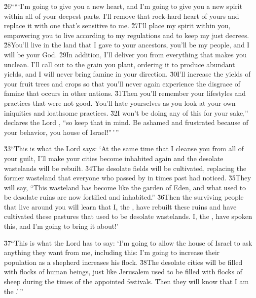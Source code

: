 \v{26}`````I'm going to give you a new heart, and I'm going to give you a new spirit within all of your deepest parts. I'll remove that rock-hard heart of yours and replace it with one that's sensitive to me. \v{27}I'll place my spirit within you, empowering you to live according to my regulations and to keep my just decrees. \v{28}You'll live in the land that I gave to your ancestors, you'll be my people, and I will be your God. \v{29}In addition, I'll deliver you from everything that makes you unclean. I'll call out to the grain you plant, ordering it to produce abundant yields, and I will never bring famine in your direction. \v{30}I'll increase the yields of your fruit trees and crops so that you'll never again experience the disgrace of famine that occurs in other nations. \v{31}Then you'll remember your lifestyles and practices that were not good. You'll hate yourselves as you look at your own iniquities and loathsome practices. \v{32}I won't be doing any of this for your sake,'' declares the Lord , ``so keep that in mind. Be ashamed and frustrated because of your behavior, you house of Israel!''\,'\,''

\v{33}``This is what the Lord  says: `At the same time that I cleanse you from all of your guilt, I'll make your cities become inhabited again and the desolate wastelands will be rebuilt. \v{34}The desolate fields will be cultivated, replacing the former wasteland that everyone who passed by in times past had noticed. \v{35}They will say, ``This wasteland has become like the garden of Eden, and what used to be desolate ruins are now fortified and inhabited.'' \v{36}Then the surviving people that live around you will learn that I, the , have rebuilt these ruins and have cultivated these pastures that used to be desolate wastelands. I, the , have spoken this, and I'm going to bring it about!'

\v{37}``This is what the Lord  has to say: `I'm going to allow the house of Israel to ask anything they want from me, including this: I'm going to increase their population as a shepherd increases his flock. \v{38}The desolate cities will be filled with flocks of human beings, just like Jerusalem used to be filled with flocks of sheep during the times of the appointed festivals. Then they will know that I am the .'\,''

